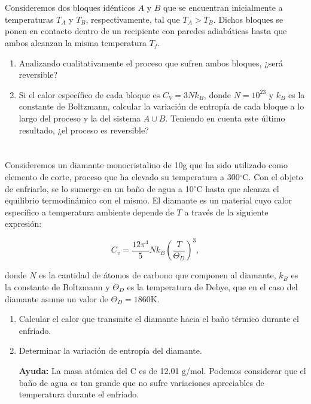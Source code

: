 \documentclass[a4paper,11pt]{article}
\begin{document}
\section{}

Consideremos dos bloques idénticos $A$ y $B$ que se encuentran 
inicialmente a temperaturas $T_A$ y $T_B$, respectivamente, tal que 
$T_A > T_B$. Dichos bloques se ponen en contacto dentro de un 
recipiente con paredes adiabáticas hasta que ambos alcanzan la misma 
temperatura $T_f$.

\begin{enumerate}[label=(\alph*),
                  leftmargin=2\parindent,
                  rightmargin=2\parindent]

    \item{Analizando cualitativamente el proceso que sufren ambos 
          bloques, ¿será reversible?}
    
    \item{Si el calor específico de cada bloque es $C_V = 3 N k_B$,
          donde $N = 10^{23}$ y $k_B$ es la constante de Boltzmann, 
          calcular la variación de entropía de cada bloque a lo largo 
          del proceso y la del sistema $A \cup B$. 
          Teniendo en cuenta este último resultado, ¿el proceso es 
          reversible?}

\end{enumerate}


\section{}

Consideremos un diamante monocristalino de 10g que ha sido utilizado 
como elemento de corte, proceso que ha elevado su temperatura a 
300$^\circ$C.
Con el objeto de enfriarlo, se lo sumerge en un baño de agua a 
10$^\circ$C hasta que alcanza el equilibrio termodinámico con el mismo.
El diamante es un material cuyo calor específico a temperatura 
ambiente depende de $T$ a través de la siguiente expresión:

$$ C_v = \frac{12\pi^4}{5} N k_B \left( \frac{T}{\Theta_D} \right)^3, $$

\noindent donde $N$ es la cantidad de átomos de carbono que componen 
al diamante, $k_B$ es la constante de Boltzmann y $\Theta_D$ es la 
temperatura de Debye, que en el caso del diamante asume un valor de 
$\Theta_D = 1860$K.

\begin{enumerate}[label=(\alph*),
                  leftmargin=2\parindent,
                  rightmargin=2\parindent]

    \item{Calcular el calor que transmite el diamante hacia el baño 
          térmico durante el enfriado.}
    
    \item{Determinar la variación de entropía del diamante.}
    
    {\small
    \textbf{Ayuda:}
    La masa atómica del C es de 12.01 g/mol.
    Podemos considerar que el baño de agua es tan grande que no sufre 
    variaciones apreciables de temperatura durante el enfriado.
    }

\end{enumerate}
\end{document}
